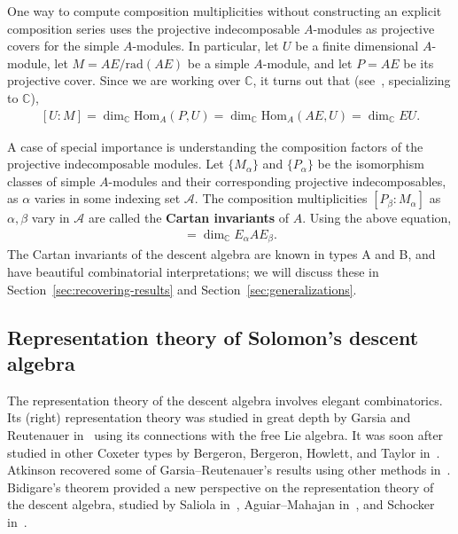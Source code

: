 \documentclass[ALCO, Unicode]{cedram}
\def\rad{\mathrm{rad}}
\def\C{{\mathbb{C}}}
\begin{document}
 One way to compute composition multiplicities without constructing an explicit composition series uses the projective indecomposable $A$-modules as projective covers for the simple $A$-modules. In particular, let $U$ be a finite dimensional $A$-module, let $M = AE / \rad(A E)$ be a simple $A$-module, and let $P = AE$ be its projective cover. 
 Since we are working over $\C$, it turns out that (see~\cite[Proposition 7.4.1]{webbrepntheory}, specializing to $\C$),
\begin{align}\label{eqn:composition-mults}
     [U: M] = \dim_\C \mathrm{Hom}_A\left(P, U\right) = \dim_\C \mathrm{Hom}_A\left(AE, U\right) = \dim_\C EU.
 \end{align}

 A case of special importance is understanding the composition factors of the projective indecomposable modules. Let $\{M_\alpha\}$ and $\{P_\alpha\}$ be the isomorphism classes of simple $A$-modules and their corresponding projective indecomposables, as $\alpha$ varies in some indexing set $\mathscr{A}$. The composition multiplicities $[P_\beta: M_\alpha]$ as $\alpha, \beta$ vary in $\mathscr{A}$ are called the \textbf{Cartan invariants} of $A.$ Using the above equation, \begin{align}
     [P_\beta: M_\alpha] = \dim_{\C} E_\alpha A E_\beta.
 \end{align}The Cartan invariants of the descent algebra are known in types A and B, and have beautiful combinatorial interpretations; we will discuss these in Section~\ref{sec:recovering-results} and Section~\ref{sec:generalizations}.

 \subsection{Representation theory of Solomon's descent algebra} \label{sec:rep-theory-descent-algebra}
 The representation theory of the descent algebra involves elegant combinatorics. Its (right) representation theory was studied in great depth by {Garsia and Reutenauer} in~\cite{garsia-reutenauer} using its connections with the free Lie algebra. It was soon after studied in other Coxeter types by Bergeron, Bergeron, Howlett, and Taylor in~\cite{Bergerons-hyper1,  Bergerons-general, Bergerons-hyper2}. Atkinson recovered some of Garsia--Reutenauer's results using other methods in~\cite{atkinson}. Bidigare's theorem provided a new perspective on the representation theory of the descent algebra, studied by Saliola in~\cite{saliolaquiverdescalgebra}, Aguiar--Mahajan in~\cite{Aguiar-Mahajan}, and Schocker in~\cite{Schocker}.
\end{document}
